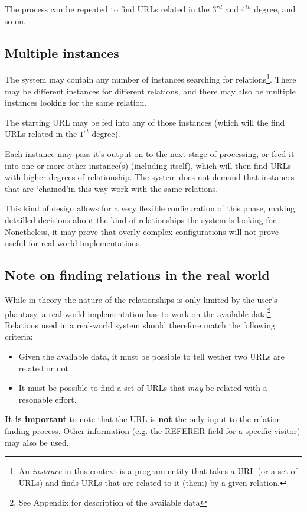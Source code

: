 \documentclass[a4paper]{danarticle}
\begin{document}
       The process can be repeated to find URLs related in the 
       $ 3^{rd} $ and $ 4^{th} $ degree, and so on.
     \subsection*{Multiple instances}
       The system may contain any number of instances searching
       for relations\footnote{An \textit{instance} in this
       context is a program entity that takes a URL (or a
       set of URLs) and finds URLs that are related to it (them)
       by a given relation.}. There may be different instances
       for different relations, and there may also be multiple
       instances looking for the same relation. 
       
       The starting URL may be fed into any of those instances
       (which will the find URLs related in the $ 1^{st} $
       degree). 
       
       Each instance may pass it's output on to the next stage
       of processing, or feed it into one or more other instance(s) 
       (including itself), which will then find URLs with higher
       degrees of relationship. The system does not demand that
       instances that are \lq chained\rq in this way work with
       the same relations. 
       
       This kind of design allows for a very flexible configuration
       of this phase, making detailled decisions about the kind
       of relationships the system is looking for.
       Nonetheless, it may prove that overly complex configurations
       will not prove useful for real-world implementations.
     \subsection*{Note on finding relations in the real world}
       While in theory the nature of the relationships is only
       limited by the user's phantasy, a real-world implementation
       has to work on the available data\footnote{See Appendix for
       description of the available data}. Relations used in a
       real-world system should therefore match the following
       criteria:
       \begin{itemize}
         \item{Given the available data, it must be possible to
	       tell wether two URLs are related or not}
	 \item{It must be possible to find a set of 
	       URLs that \textit{may} be related with
	       a resonable effort.}
       \end{itemize}
       \textbf{It is important} to note that the URL is \textbf{not}
       the only input to the relation-finding process. Other information
       (e.g. the REFERER field for a specific visitor) may also be used.
\end{document}

